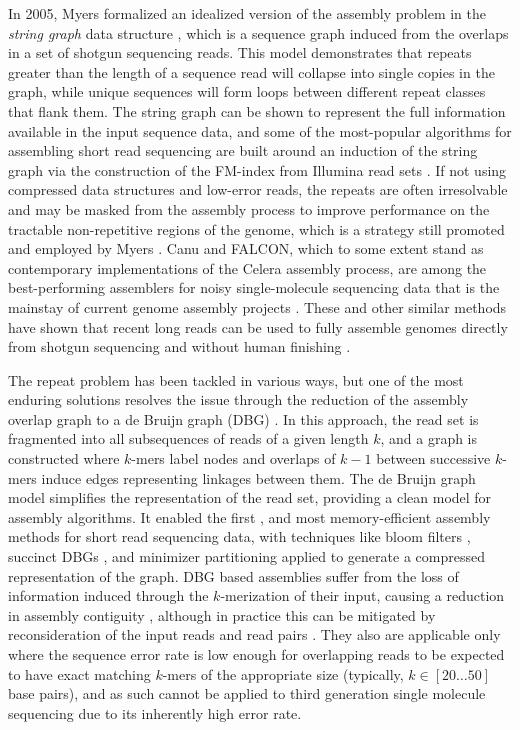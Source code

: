 In 2005, Myers formalized an idealized version of the assembly problem in the \emph{string graph} data structure \cite{myers2005}, which is a sequence graph induced from the overlaps in a set of shotgun sequencing reads.
This model demonstrates that repeats greater than the length of a sequence read will collapse into single copies in the graph, while unique sequences will form loops between different repeat classes that flank them.
The string graph can be shown to represent the full information available in the input sequence data, and some of the most-popular algorithms for assembling short read sequencing are built around an induction of the string graph via the construction of the FM-index \cite{ferragina2001experimental} from Illumina read sets \cite{simpson2010,simpson2012efficient,li2015fermikit}.
If not using compressed data structures and low-error reads, the repeats are often irresolvable and may be masked from the assembly process to improve performance on the tractable non-repetitive regions of the genome, which is a strategy still promoted and employed by Myers \cite{myers2014efficient}.
Canu and FALCON, which to some extent stand as contemporary implementations of the Celera assembly process, are among the best-performing assemblers for noisy single-molecule sequencing data that is the mainstay of current genome assembly projects \cite{chin2016phased,koren2017canu}.
These and other similar methods have shown that recent long reads can be used to fully assemble genomes directly from shotgun sequencing and without human finishing \cite{loman2015complete,jain2018nanopore}.

The repeat problem has been tackled in various ways, but one of the most enduring solutions resolves the issue through the reduction of the assembly overlap graph to a de Bruijn graph (DBG) \cite{pevzner2001eulerian}.
In this approach, the read set is fragmented into all subsequences of reads of a given length $k$, and a graph is constructed where $k$-mers label nodes and overlaps of $k-1$ between successive $k$-mers induce edges representing linkages between them.
The de Bruijn graph model simplifies the representation of the read set, providing a clean model for assembly algorithms.
It enabled the first \cite{zerbino2008velvet,simpson2009abyss,iqbal2012novo}, and most memory-efficient assembly methods for short read sequencing data, with techniques like bloom filters \cite{chikhi2013space}, succinct DBGs \cite{bowe2012succinct,li2015megahit}, and minimizer partitioning \cite{chikhi2016compacting} applied to generate a compressed representation of the graph.
DBG based assemblies suffer from the loss of information induced through the $k$-merization of their input, causing a reduction in assembly contiguity \cite{earl2011assemblathon}, although in practice this can be mitigated by reconsideration of the input reads and read pairs \cite{butler2008allpaths}.
They also are applicable only where the sequence error rate is low enough for overlapping reads to be expected to have exact matching $k$-mers of the appropriate size (typically, $k \in [20 \ldots 50]$ base pairs), and as such cannot be applied to third generation single molecule sequencing due to its inherently high error rate.

